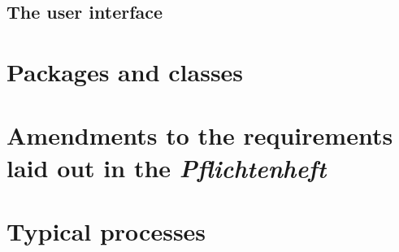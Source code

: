 \documentclass[a4paper, parskip=half]{scrartcl}
\begin{document}
\subsection{The user interface}



\section{Packages and classes}


\section{Amendments to the requirements laid out in the \textit{Pflichtenheft}}


\section{Typical processes}

\end{document}
